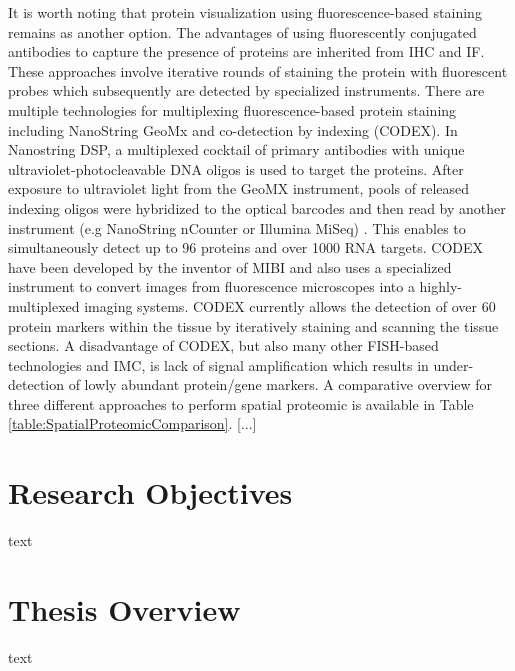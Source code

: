 It is worth noting that protein visualization using fluorescence-based staining remains as another option. The advantages of using fluorescently conjugated antibodies to capture the presence of proteins are inherited from IHC and IF. These approaches involve iterative rounds of staining the protein with fluorescent probes which subsequently are detected by specialized instruments. There are multiple technologies for multiplexing fluorescence-based protein staining including NanoString GeoMx and co-detection by indexing (CODEX). In Nanostring DSP, a multiplexed cocktail of primary antibodies with  unique ultraviolet-photocleavable DNA oligos is used to target the proteins. After exposure to ultraviolet light from the GeoMX instrument, pools of released indexing oligos were hybridized to the optical barcodes and then read by another instrument (e.g NanoString nCounter or Illumina MiSeq) \cite{de2020unraveling, helmink2020b}. This enables to simultaneously detect up to 96 proteins and over 1000 RNA targets. CODEX have been developed by the inventor of MIBI and also uses a specialized instrument to convert images from fluorescence microscopes into a highly-multiplexed imaging systems. CODEX currently allows the detection of over 60 protein markers within the tissue by iteratively staining and scanning the tissue sections\cite{goltsev2018deep}. A disadvantage of CODEX, but also many other FISH-based technologies and IMC, is lack of signal amplification which results in under-detection of lowly abundant protein/gene markers. A comparative overview for three different approaches to perform spatial proteomic is available in Table \ref{table:SpatialProteomicComparison}. [...]

\section{Research Objectives}
text
\section{Thesis Overview}
text

